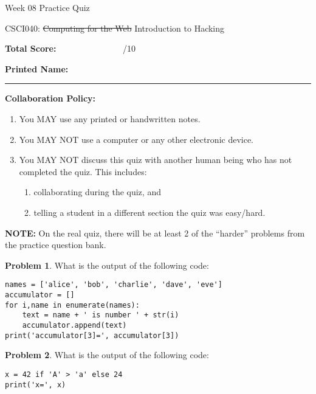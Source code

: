 \documentclass[10pt]{article}
\theoremstyle{definition}
\newtheorem{problem}{Problem}
\begin{document}
\begin{center}
    {
\Large
    Week 08 Practice Quiz
}

    \vspace{0.1in}
    CSCI040: \sout{Computing for the Web} Introduction to Hacking

    \vspace{0.1in}
\end{center}


\vspace{0.15in}
\noindent
\textbf{Total Score:} ~~~~~~~~~~~~~~~/10

\vspace{0.5in}
\noindent
\textbf{Printed Name:}

\noindent
\rule{\textwidth}{0.1pt}
\vspace{0.25in}

\noindent
\textbf{Collaboration Policy:}
\begin{enumerate}
    \item You MAY use any printed or handwritten notes.
    \item You MAY NOT use a computer or any other electronic device.
    \item You MAY NOT discuss this quiz with another human being who has not completed the quiz.
        This includes:
        \begin{enumerate}
            \item collaborating during the quiz, and
            \item telling a student in a different section the quiz was easy/hard.
        \end{enumerate}
\end{enumerate}


\noindent
\textbf{NOTE:}
On the real quiz, there will be at least 2 of the ``harder'' problems from the practice question bank.
\vspace{0.15in}

\begin{problem}
    What is the output of the following code:
\end{problem}
\begin{lstlisting}
names = ['alice', 'bob', 'charlie', 'dave', 'eve']
accumulator = []
for i,name in enumerate(names):
    text = name + ' is number ' + str(i)
    accumulator.append(text)
print('accumulator[3]=', accumulator[3])
\end{lstlisting}
\vspace{1.5in}

\begin{problem}
    What is the output of the following code:
\end{problem}
\begin{lstlisting}
x = 42 if 'A' > 'a' else 24
print('x=', x)
\end{lstlisting}
\vspace{1.5in}
\end{document}
